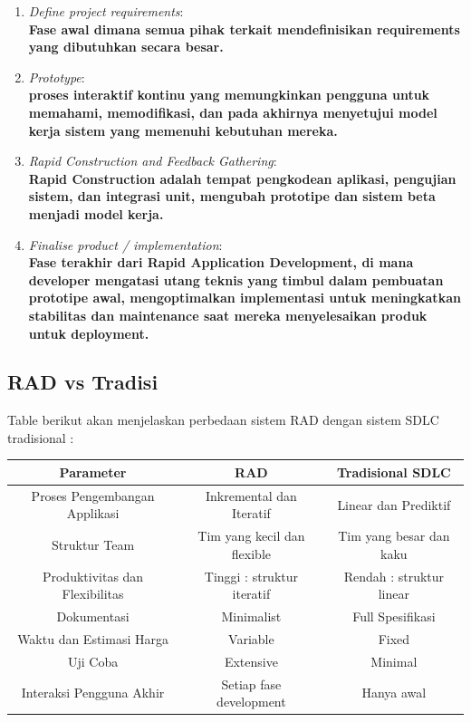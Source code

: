 \begin{enumerate}
    \item \emph{Define project requirements}:\\
    \textbf{Fase awal dimana semua pihak terkait mendefinisikan requirements yang dibutuhkan secara besar.}

    \item \emph{Prototype}:\\
    \textbf{proses interaktif kontinu yang memungkinkan pengguna untuk memahami, memodifikasi, dan pada akhirnya menyetujui model kerja sistem yang memenuhi kebutuhan mereka.}

    \item \emph{Rapid Construction and Feedback Gathering}:\\
    \textbf{Rapid Construction adalah tempat pengkodean aplikasi, pengujian sistem, dan integrasi unit, mengubah prototipe dan sistem beta menjadi model kerja.}

    \item \emph{Finalise product / implementation}:\\
    \textbf{Fase terakhir dari Rapid Application Development, di mana developer mengatasi utang teknis yang timbul dalam pembuatan prototipe awal, mengoptimalkan implementasi untuk meningkatkan stabilitas dan maintenance saat mereka menyelesaikan produk untuk deployment.}
\end{enumerate}

\subsection{RAD vs Tradisi}
Table berikut akan menjelaskan perbedaan sistem RAD dengan sistem SDLC tradisional\cite{wavemaker} :

\newpage

\begin{center}
    \begin{tabular}{||c c c ||} 
     \hline
     Parameter & RAD & Tradisional SDLC \\ [0.5ex] 
     \hline\hline
     Proses Pengembangan Applikasi & Inkremental dan Iteratif & Linear dan Prediktif\\ 
     \hline
     Struktur Team & Tim yang kecil dan flexible & Tim yang besar dan kaku \\
     \hline
     Produktivitas dan Flexibilitas & Tinggi : struktur iteratif & Rendah : struktur linear\\
     \hline
     Dokumentasi & Minimalist & Full Spesifikasi \\
     \hline
     Waktu dan Estimasi Harga & Variable & Fixed \\
     \hline
     Uji Coba & Extensive & Minimal \\
     \hline
     Interaksi Pengguna Akhir & Setiap fase development & Hanya awal\\
     \hline
    \end{tabular}
\end{center}    

